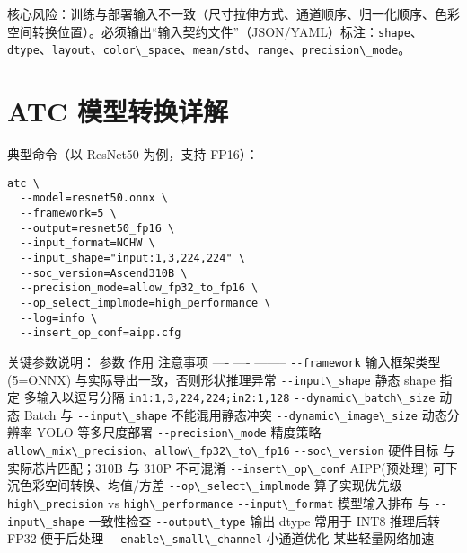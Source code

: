 核心风险：训练与部署输入不一致（尺寸拉伸方式、通道顺序、归一化顺序、色彩空间转换位置）。必须输出``输入契约文件''（JSON/YAML）标注：\passthrough{\lstinline!shape!}、\passthrough{\lstinline!dtype!}、\passthrough{\lstinline!layout!}、\passthrough{\lstinline!color\_space!}、\passthrough{\lstinline!mean/std!}、\passthrough{\lstinline!range!}、\passthrough{\lstinline!precision\_mode!}。

\section{ATC
模型转换详解}\label{atc-ux6a21ux578bux8f6cux6362ux8be6ux89e3}

典型命令（以 ResNet50 为例，支持 FP16）：

\begin{lstlisting}
atc \
  --model=resnet50.onnx \
  --framework=5 \
  --output=resnet50_fp16 \
  --input_format=NCHW \
  --input_shape="input:1,3,224,224" \
  --soc_version=Ascend310B \
  --precision_mode=allow_fp32_to_fp16 \
  --op_select_implmode=high_performance \
  --log=info \
  --insert_op_conf=aipp.cfg
\end{lstlisting}

关键参数说明： \textbar{} 参数 \textbar{} 作用 \textbar{} 注意事项
\textbar{} \textbar{} ---- \textbar{} ---- \textbar{} --------
\textbar{} \textbar{} \passthrough{\lstinline!--framework!} \textbar{}
输入框架类型 (5=ONNX) \textbar{} 与实际导出一致，否则形状推理异常
\textbar{} \textbar{} \passthrough{\lstinline!--input\_shape!}
\textbar{} 静态 shape 指定 \textbar{} 多输入以逗号分隔
\passthrough{\lstinline!in1:1,3,224,224;in2:1,128!} \textbar{}
\textbar{} \passthrough{\lstinline!--dynamic\_batch\_size!} \textbar{}
动态 Batch \textbar{} 与 \passthrough{\lstinline!--input\_shape!}
不能混用静态冲突 \textbar{} \textbar{}
\passthrough{\lstinline!--dynamic\_image\_size!} \textbar{} 动态分辨率
\textbar{} YOLO 等多尺度部署 \textbar{} \textbar{}
\passthrough{\lstinline!--precision\_mode!} \textbar{} 精度策略
\textbar{}
\passthrough{\lstinline!allow\_mix\_precision!}、\passthrough{\lstinline!allow\_fp32\_to\_fp16!}
\textbar{} \textbar{} \passthrough{\lstinline!--soc\_version!}
\textbar{} 硬件目标 \textbar{} 与实际芯片匹配；310B 与 310P 不可混淆
\textbar{} \textbar{} \passthrough{\lstinline!--insert\_op\_conf!}
\textbar{} AIPP(预处理) \textbar{} 可下沉色彩空间转换、均值/方差
\textbar{} \textbar{} \passthrough{\lstinline!--op\_select\_implmode!}
\textbar{} 算子实现优先级 \textbar{}
\passthrough{\lstinline!high\_precision!} vs
\passthrough{\lstinline!high\_performance!} \textbar{} \textbar{}
\passthrough{\lstinline!--input\_format!} \textbar{} 模型输入排布
\textbar{} 与 \passthrough{\lstinline!--input\_shape!} 一致性检查
\textbar{} \textbar{} \passthrough{\lstinline!--output\_type!}
\textbar{} 输出 dtype \textbar{} 常用于 INT8 推理后转 FP32 便于后处理
\textbar{} \textbar{} \passthrough{\lstinline!--enable\_small\_channel!}
\textbar{} 小通道优化 \textbar{} 某些轻量网络加速 \textbar{}

